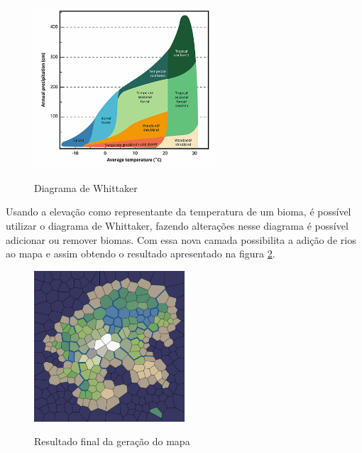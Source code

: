 \begin{figure}[H]
	\caption{Diagrama de Whittaker}
	\centering
	\includegraphics[width=0.6\textwidth]{figures/diagrama-whittaker.png}
	\label{fig:diagrama-whittaker}
\end{figure}

Usando a elevação como representante da temperatura de um bioma, é possível utilizar o diagrama de Whittaker, fazendo alterações nesse diagrama é possível adicionar ou remover biomas. Com essa nova camada possibilita a adição de rios ao mapa \cite{amitp2010} e assim obtendo o resultado apresentado na figura \ref{fig:biomes}.

\begin{figure}[H]
	\caption{Resultado final da geração do mapa}
	\centering
	\includegraphics[width=0.5\textwidth]{figures/biomes.png}
	\label{fig:biomes}
\end{figure}



